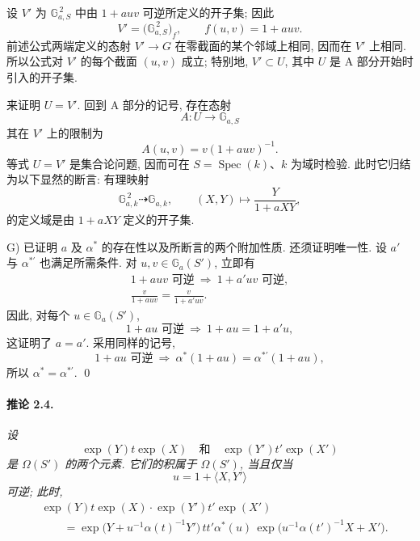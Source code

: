 设 \(V'\) 为 \(\mathbb G_{a,S}^{\,2}\) 中由 \(1+auv\) 可逆所定义的开子集; 因此
\[
  V'=\bigl(\mathbb G_{a,S}^{\,2}\bigr)_f,
  \qquad f(u,v)=1+auv.
\]
前述公式两端定义的态射 \(V'\to G\) 在零截面的某个邻域上相同, 因而在 \(V'\) 上相同. 所以公式对 \(V'\) 的每个截面 \((u,v)\) 成立; 特别地, \(V'\subset U\), 其中 \(U\) 是 A 部分开始时引入的开子集.

来证明 \(U=V'\). 回到 A 部分的记号, 存在态射
\[
  A\colon U\longrightarrow\mathbb G_{a,S}
\]
其在 \(V'\) 上的限制为
\[
  A(u,v)=v(1+auv)^{-1}.
\]
等式 \(U=V'\) 是集合论问题, 因而可在 \(S=\operatorname{Spec}(k)\)、\(k\) 为域时检验. 此时它归结为以下显然的断言: 有理映射
\[
  \mathbb G_{a,k}^{\,2}\dashrightarrow\mathbb G_{a,k},
  \qquad
  (X,Y)\longmapsto\frac{Y}{1+aXY},
\]
的定义域是由 \(1+aXY\) 定义的开子集.

\textup{G)} 已证明 \(a\) 及 \(\alpha^\ast\) 的存在性以及所断言的两个附加性质. 还须证明唯一性. 设 \(a'\) 与 \(\alpha^{\ast\prime}\) 也满足所需条件. 对 \(u,v\in\mathbb G_a(S')\), 立即有
\[
\begin{gathered}
  1+auv\text{ 可逆}
    \ \Longrightarrow\
  1+a'uv\text{ 可逆},\\
  \frac{v}{1+auv}=\frac{v}{1+a'uv}.
\end{gathered}
\]
因此, 对每个 \(u\in\mathbb G_a(S')\),
\[
  1+au\text{ 可逆}
    \ \Longrightarrow\
  1+au=1+a'u,
\]
这证明了 \(a=a'\). 采用同样的记号,
\[
  1+au\text{ 可逆}
    \ \Longrightarrow\
  \alpha^\ast(1+au)=\alpha^{\ast\prime}(1+au),
\]
所以 \(\alpha^\ast=\alpha^{\ast\prime}\).
\qed

\paragraph{\textbf{推论 2.4.}}
\emph{设}
\[
  \exp(Y)t\exp(X)
  \quad\text{和}\quad
  \exp(Y')t'\exp(X')
\]
\emph{是 \(\Omega(S')\) 的两个元素. 它们的积属于 \(\Omega(S')\), 当且仅当}
\[
  u=1+\langle X,Y'\rangle
\]
\emph{可逆; 此时,}
\begin{equation}\tag{F'}
\begin{split}
  &\exp(Y)t\exp(X)\cdot\exp(Y')t'\exp(X')\\
  &\qquad
   =\exp\bigl(Y+u^{-1}\alpha(t)^{-1}Y'\bigr)\,
      tt'\alpha^\ast(u)\,
      \exp\bigl(u^{-1}\alpha(t')^{-1}X+X'\bigr).
\end{split}
\end{equation}

